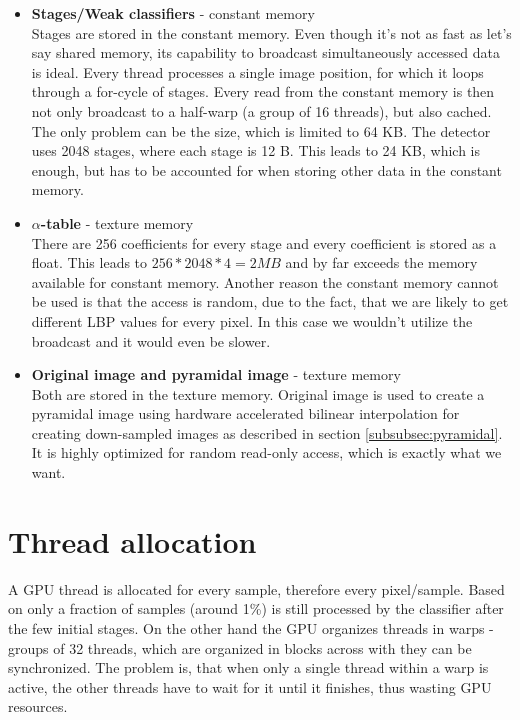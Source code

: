 \begin{itemize}
\item \textbf{Stages/Weak classifiers} - constant memory \\
Stages are stored in the constant memory. Even though it's not as fast as let's say shared memory, its capability to broadcast simultaneously accessed data is ideal. Every thread processes a single image position, for which it loops through a for-cycle of stages. Every read from the constant memory is then not only broadcast to a half-warp (a group of 16 threads), but also cached. The only problem can be the size, which is limited to 64 KB. The detector uses 2048 stages, where each stage is 12 B. This leads to 24 KB, which is enough, but has to be accounted for when storing other data in the constant memory.

\item \textbf{$\alpha$-table} - texture memory \\
There are 256 coefficients for every stage and every coefficient is stored as a float. This leads to $256 * 2048 * 4 = 2 MB$ and by far exceeds the memory available for constant memory. Another reason the constant memory cannot be used is that the access is random, due to the fact, that we are likely to get different LBP values for every pixel. In this case we wouldn't utilize the broadcast and it would even be slower.

\item \textbf{Original image and pyramidal image} - texture memory \\
Both are stored in the texture memory. Original image is used to create a pyramidal image using hardware accelerated bilinear interpolation for creating down-sampled images as described in section \ref{subsubsec:pyramidal}. It is highly optimized for random read-only access, which is exactly what we want.
\end{itemize}

\section{Thread allocation}\label{sec:thread-alloc}

A GPU thread is allocated for every sample, therefore every pixel/sample. Based on \cite{herout2011real} only a fraction of samples (around 1\%) is still processed by the classifier after the few initial stages. On the other hand the GPU organizes threads in warps - groups of 32 threads, which are organized in blocks across with they can be synchronized. The problem is, that when only a single thread within a warp is active, the other threads have to wait for it until it finishes, thus wasting GPU resources.

